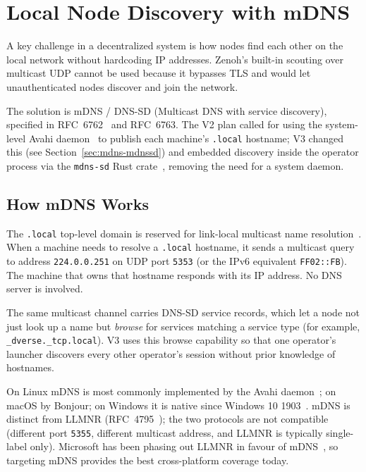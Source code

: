 \documentclass[11pt,a4paper]{article}
\begin{document}
\section{Local Node Discovery with mDNS}
\label{sec:mdns}

A key challenge in a decentralized system is how nodes find each
other on the local network without hardcoding IP addresses. Zenoh's
built-in scouting over multicast UDP cannot be used because it
bypasses TLS and would let unauthenticated nodes discover and join
the network.

The solution is mDNS / DNS-SD (Multicast DNS with service discovery),
specified in RFC~6762~\citep{rfc6762} and RFC~6763. The V2 plan
called for using the system-level Avahi daemon~\citep{avahi} to
publish each machine's \texttt{.local} hostname; V3 changed this
(see Section~\ref{sec:mdns-mdnssd}) and embedded discovery inside the
operator process via the \texttt{mdns-sd} Rust
crate~\citep{mdnssd}, removing the need for a system daemon.

\subsection{How mDNS Works}

The \texttt{.local} top-level domain is reserved for link-local
multicast name resolution~\citep{rfc6762}. When a machine needs to
resolve a \texttt{.local} hostname, it sends a multicast query to
address \texttt{224.0.0.251} on UDP port \texttt{5353} (or the IPv6
equivalent \texttt{FF02::FB}). The machine that owns that hostname
responds with its IP address. No DNS server is involved.

The same multicast channel carries DNS-SD service records, which let
a node not just look up a name but \emph{browse} for services
matching a service type (for example, \texttt{\_dverse.\_tcp.local}).
V3 uses this browse capability so that one operator's launcher
discovers every other operator's session without prior knowledge of
hostnames.

On Linux mDNS is most commonly implemented by the Avahi
daemon~\citep{avahi}; on macOS by Bonjour; on Windows it is native
since Windows 10 1903~\citep{ms-mdns}. mDNS is distinct from LLMNR
(RFC~4795~\citep{rfc4795}); the two protocols are not compatible
(different port \texttt{5355}, different multicast address, and LLMNR
is typically single-label only). Microsoft has been phasing out
LLMNR in favour of mDNS~\citep{ms-mdns}, so targeting mDNS provides
the best cross-platform coverage today.
\end{document}

